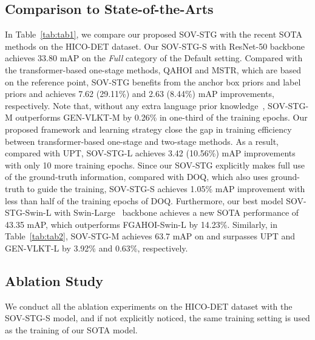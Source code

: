 \documentclass[10pt,twocolumn,letterpaper]{article}
\begin{document}
\subsection{Comparison to State-of-the-Arts}

In Table~\ref{tab:tab1}, we compare our proposed SOV-STG with the recent SOTA methods on the HICO-DET dataset.
Our SOV-STG-S with ResNet-50 backbone achieves 33.80 mAP on the \textit{Full} category of the Default setting.
Compared with the transformer-based one-stage methods, QAHOI and MSTR, which are based on the reference point,
SOV-STG benefits from the anchor box priors and label priors and achieves 7.62 (29.11\%) and 2.63 (8.44\%) mAP improvements, respectively.
Note that, without any extra language prior knowledge~\cite{radford2021learning}, SOV-STG-M outperforms GEN-VLKT-M by 0.26\% in one-third of the training epochs.
Our proposed framework and learning strategy close the gap in training efficiency between transformer-based one-stage and two-stage methods.
As a result, compared with UPT, SOV-STG-L achieves 3.42 (10.56\%) mAP improvements with only 10 more training epochs.
Since our SOV-STG explicitly makes full use of the ground-truth information, compared with DOQ, which also uses ground-truth to guide the training, SOV-STG-S achieves 1.05\% mAP improvement with less than half of the training epochs of DOQ.
Furthermore, our best model SOV-STG-Swin-L with Swin-Large~\cite{liu2021swin} backbone achieves a new SOTA performance of 43.35 mAP, which outperforms FGAHOI-Swin-L by 14.23\%.
Similarly, in Table~\ref{tab:tab2}, SOV-STG-M achieves 63.7 mAP on  and surpasses UPT and GEN-VLKT-L by 3.92\% and 0.63\%, respectively.

\subsection{Ablation Study}

We conduct all the ablation experiments on the HICO-DET dataset with the SOV-STG-S model, and if not explicitly noticed, the same training setting is used as the training of our SOTA model.
\end{document}
